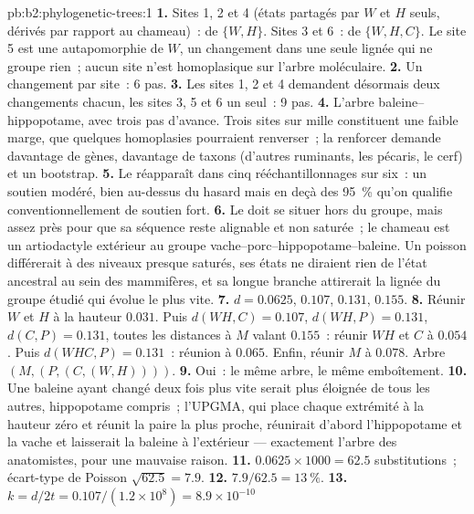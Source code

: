 \begin{solution}{pb:b2:phylogenetic-trees:1}
\textbf{1.} Sites 1, 2 et 4 (états partagés par $W$ et $H$ seuls,
dérivés par rapport au chameau)~:  de $\{W,H\}$. Sites 3
et 6~:  de $\{W,H,C\}$. Le site 5 est une autapomorphie de
$W$, un changement dans une seule lignée qui ne groupe rien~; aucun site
n'est homoplasique sur l'arbre moléculaire.
\textbf{2.} Un changement par site~: 6 pas.
\textbf{3.} Les sites 1, 2 et 4 demandent désormais deux changements
chacun, les sites 3, 5 et 6 un seul~: 9 pas.
\textbf{4.} L'arbre baleine--hippopotame, avec trois pas d'avance. Trois
sites sur mille constituent une faible marge, que quelques homoplasies
pourraient renverser~; la renforcer demande davantage de gènes, davantage
de taxons (d'autres ruminants, les pécaris, le cerf) et un bootstrap.
\textbf{5.} Le  réapparaît dans cinq rééchantillonnages sur six~:
un soutien modéré, bien au-dessus du hasard mais en deçà des
\qty{95}{\%} qu'on qualifie conventionnellement de soutien fort.
\textbf{6.} Le  doit se situer hors du groupe, mais assez
près pour que sa séquence reste alignable et non saturée~; le chameau est
un artiodactyle extérieur au groupe vache--porc--hippopotame--baleine. Un
poisson différerait à des niveaux presque saturés, ses états ne diraient
rien de l'état ancestral au sein des mammifères, et sa longue branche
attirerait la lignée du groupe étudié qui évolue le plus vite.
\textbf{7.} $d = 0.0625$, $0.107$, $0.131$, $0.155$.
\textbf{8.} Réunir $W$ et $H$ à la hauteur $0.031$. Puis $d(WH,C) =
0.107$, $d(WH,P) = 0.131$, $d(C,P) = 0.131$, toutes les distances à $M$
valant $0.155$~: réunir $WH$ et $C$ à $0.054$. Puis $d(WHC,P) = 0.131$~:
réunion à $0.065$. Enfin, réunir $M$ à $0.078$. Arbre $(M,(P,(C,(W,H))))$.
\textbf{9.} Oui~: le même arbre, le même emboîtement.
\textbf{10.} Une baleine ayant changé deux fois plus vite serait plus
éloignée de tous les autres, hippopotame compris~; l'UPGMA, qui place
chaque extrémité à la hauteur zéro et réunit la paire la plus proche,
réunirait d'abord l'hippopotame et la vache et laisserait la baleine à
l'extérieur --- exactement l'arbre des anatomistes, pour une mauvaise
raison.
\textbf{11.} $0.0625\times 1000 = 62.5$ substitutions~; écart-type de
Poisson $\sqrt{62.5} = 7.9$.
\textbf{12.} $7.9/62.5 = \qty{13}{\%}$.
\textbf{13.} $k = d/2t = 0.107/(1.2\times 10^{8}) = 8.9\times 10^{-10}$

\end{solution}
